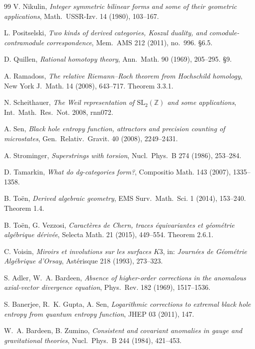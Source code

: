 \documentclass[11pt,reqno]{amsart}
\theoremstyle{plain}
\theoremstyle{definition}
\theoremstyle{remark}
\newcommand{\Zbb}{\mathbb{Z}}
\begin{document}
\begin{thebibliography}{99}
 V. Nikulin, \emph{Integer symmetric bilinear forms and some of their geometric applications}, Math.~USSR-Izv. 14 (1980), 103--167.

 L. Positselski, \emph{Two kinds of derived categories, Koszul duality, and comodule-contramodule correspondence}, Mem.~AMS 212 (2011), no.~996. §6.5.

 D. Quillen, \emph{Rational homotopy theory}, Ann.~Math. 90 (1969), 205--295. §9.

 A. Ramadoss, \emph{The relative Riemann--Roch theorem from Hochschild homology}, New York J.~Math. 14 (2008), 643--717. Theorem 3.3.1.

 N. Scheithauer, \emph{The Weil representation of $\mathrm{SL}_2(\Zbb)$ and some applications}, Int.~Math.~Res.~Not. 2008, rnn072.

 A. Sen, \emph{Black hole entropy function, attractors and precision counting of microstates}, Gen.~Relativ.~Gravit. 40 (2008), 2249--2431.

 A. Strominger, \emph{Superstrings with torsion}, Nucl.~Phys.~B 274 (1986), 253--284.

 D. Tamarkin, \emph{What do dg-categories form?}, Compositio Math. 143 (2007), 1335--1358.

 B. To\"en, \emph{Derived algebraic geometry}, EMS Surv.~Math.~Sci. 1 (2014), 153--240. Theorem 1.4.

 B. To\"en, G. Vezzosi, \emph{Caract\`eres de Chern, traces \'equivariantes et g\'eom\'etrie alg\'ebrique d\'eriv\'ee}, Selecta Math. 21 (2015), 449--554. Theorem 2.6.1.

 C. Voisin, \emph{Miroirs et involutions sur les surfaces $K3$}, in: \emph{Journ\'ees de G\'eom\'etrie Alg\'ebrique d'Orsay}, Ast\'erisque 218 (1993), 273--323.


 S. Adler, W.~A. Bardeen, \emph{Absence of higher-order corrections in the anomalous axial-vector divergence equation}, Phys.~Rev. 182 (1969), 1517--1536.

 S. Banerjee, R.~K. Gupta, A. Sen, \emph{Logarithmic corrections to extremal black hole entropy from quantum entropy function}, JHEP 03 (2011), 147.

 W.~A. Bardeen, B. Zumino, \emph{Consistent and covariant anomalies in gauge and gravitational theories}, Nucl.~Phys.~B 244 (1984), 421--453.


\end{thebibliography}
\end{document}
